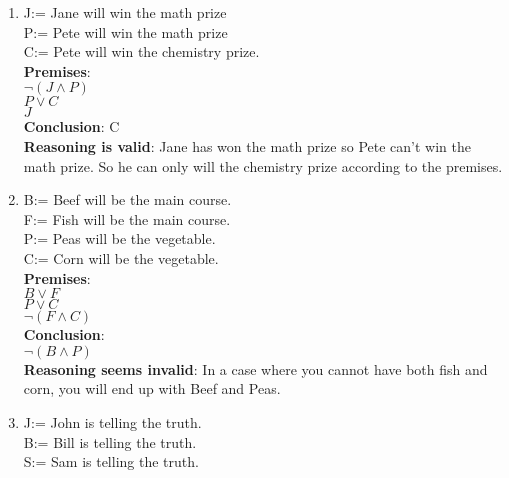\begin{solution}
    \begin{enumerate}
        \item 
                J:= Jane will win the math prize \\
                P:= Pete will win the math prize \\
                C:= Pete will win the chemistry prize. \\
                
                \textbf{Premises}: \\
                $\neg (J \wedge P)$ \\
                $P \vee C$ \\
                $J$ \\
                
                \textbf{Conclusion}: C \\
                
                \textbf{Reasoning is valid}: Jane has won the math prize so Pete can't win the math prize. So he can only will the chemistry prize according to the premises.
        
        \item 
                B:= Beef will be the main course. \\
                F:= Fish will be the main course. \\
                P:= Peas will be the vegetable. \\
                C:= Corn will be the vegetable. \\
                
                \textbf{Premises}: \\
                $B \vee F$ \\
                $P \vee C$ \\
                $\neg(F \wedge C)$ \\
                
                \textbf{Conclusion}: \\
                $\neg(B \wedge P)$ \\
                
                \textbf{Reasoning seems invalid}: In a case where you cannot have both fish and corn, you will end up with Beef and Peas.
                
        \item
                J:= John is telling the truth. \\
                B:= Bill is telling the truth.\\
                S:= Sam is telling the truth.\\
                

\end{enumerate}
\end{solution}
